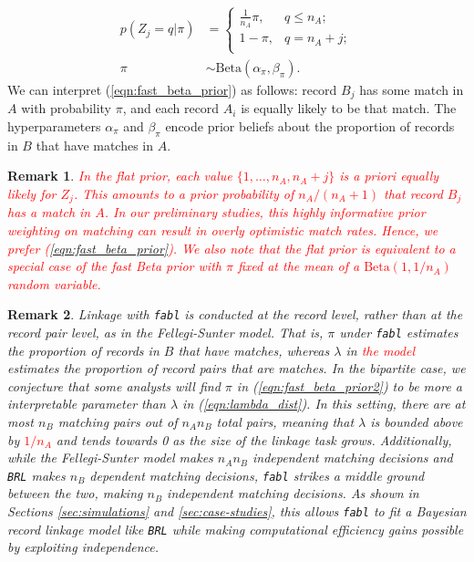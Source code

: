 \documentclass[ba]{imsart}
\newtheorem{rem}{Remark}
\begin{document}
\begin{subequations}
\begin{align}
	p(Z_j = q| \pi) &= \begin{cases} 
	\frac{1}{n_A}\pi,  & q \leq n_A;\\
	1-\pi, &  q  = n_A + j;  \\
\end{cases} \label{eqn:fast_beta_prior}  \\
\pi &\sim \text{Beta}(\alpha_{\pi}, \beta_{\pi}) \label{eqn:fast_beta_prior2}.
\end{align}
\end{subequations}
We can interpret (\ref{eqn:fast_beta_prior}) as follows: record $B_j$ has some match in $A$ with probability $\pi$, and each record $A_i$ is equally likely to be that match. The hyperparameters $\alpha_{\pi}$ and $\beta_{\pi}$ encode prior beliefs about  the proportion of records in $B$ that have matches in $A.$ 

\begin{rem}
\textcolor{red}{
In the \cite{wortman2019} flat prior, each value $\{1, \ldots, n_A, n_A +j\}$ is a priori equally likely for $Z_j$. This amounts to a prior probability of $n_A / (n_A + 1)$ that record $B_j$ has a match in $A$. In our preliminary studies, this highly informative prior weighting on matching can result in overly optimistic match rates. Hence, \textcolor{red}{we prefer (\ref{eqn:fast_beta_prior}).} We also note that the flat prior is equivalent to a special case of the fast Beta prior with $\pi$ fixed at the mean of a $\text{Beta}\left(1, 1 / n_A \right)$ random variable.
}
\end{rem}

\begin{rem}
Linkage with \texttt{fabl} is conducted at the record level, rather than at the record pair level, as in the Fellegi-Sunter model. That is, $\pi$ under \texttt{fabl} estimates the proportion of records in $B$ that have matches, whereas $\lambda$ in \textcolor{red}{the \cite{fellegi_theory_1969} model} estimates the proportion of record pairs that are matches. In the bipartite case, we conjecture that some analysts will find $\pi$ in (\ref{eqn:fast_beta_prior2}) to be more a interpretable parameter than $\lambda$ in (\ref{eqn:lambda_dist}). In this setting, there are at most $n_B$ matching pairs out of $n_A n_B$ total pairs, meaning that $\lambda$ is bounded above by \textcolor{red}{$1/n_A$} and tends towards 0 as the size of the linkage task grows. Additionally, while the Fellegi-Sunter model makes $n_A  n_B$ independent matching decisions and \texttt{BRL} makes $n_B$ dependent matching decisions, \texttt{fabl} strikes a middle ground between the two, making $n_B$  independent matching decisions. As shown in Sections \ref{sec:simulations} and \ref{sec:case-studies}, this allows \texttt{fabl} to fit a Bayesian record linkage model like \texttt{BRL} while making computational efficiency gains possible by exploiting independence. 
\end{rem}
\end{document}
